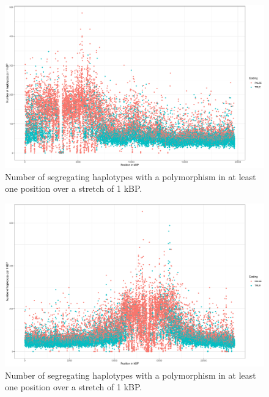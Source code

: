\begin{figure}[th]
\centering
\includegraphics[height=.55\textheight, width=1.1\textwidth]{Figures/chr2_hap}
\decoRule
\caption[Haplotype strutcture of chromosome 2 of \textit{A. thaliana}]{Number of segregating haplotypes with a polymorphism in at least one position over a stretch of 1 kBP. }
\label{fig:chr2}
\end{figure}


\begin{figure}[th]
\centering
\includegraphics[height=.55\textheight, width=1.1\textwidth]{Figures/chr3_hap}
\decoRule
\caption[Haplotype strutcture of chromosome 3 of \textit{A. thaliana}]{Number of segregating haplotypes with a polymorphism in at least one position over a stretch of 1 kBP. }
\label{fig:chr3}
\end{figure}


